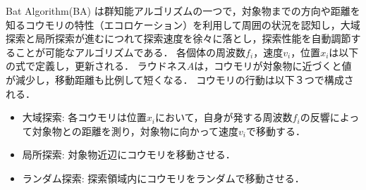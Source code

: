 \documentclass[a4j,11pt]{jarticle}
\begin{document}
  \makeatletter
  \renewcommand{\theequation}{\arabic{section}-\arabic{subsection}-\arabic{equation}}
  \makeatother

Bat Algorithm(BA) \cite{BA}は群知能アルゴリズムの一つで，対象物までの方向や距離を知るコウモリの特性（エコロケーション）を利用して周囲の状況を認知し，大域探索と局所探索が進むにつれて探索速度を徐々に落とし，探索性能を自動調節することが可能なアルゴリズムである．
各個体の周波数${f_i}$，速度${v_i}$，位置${x_i}$は以下の式で定義し，更新される．
ラウドネス${A}$は，コウモリが対象物に近づくと値が減少し，移動距離も比例して短くなる．
コウモリの行動は以下３つで構成される．
\begin{itemize}
\item 大域探索: 各コウモリは位置${x_i}$において，自身が発する周波数${f_i}$の反響によって対象物との距離を測り，対象物に向かって速度${v_i}$で移動する．
\item 局所探索: 対象物近辺にコウモリを移動させる．
\item ランダム探索: 探索領域内にコウモリをランダムで移動させる．
\end{itemize}
\end{document}

